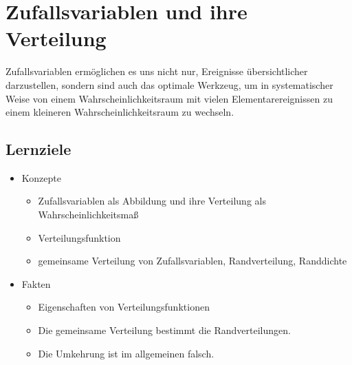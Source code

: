 

\chapter{Zufallsvariablen und ihre Verteilung}\label{ch:zufallsvariablen-und-ihre-verteilung}
Zufallsvariablen ermöglichen es uns nicht nur, Ereignisse übersichtlicher darzustellen, sondern sind auch
das optimale Werkzeug, um in systematischer Weise von einem Wahrscheinlichkeitsraum mit vielen
Elementarereignissen zu einem kleineren Wahrscheinlichkeitsraum zu wechseln.

\section*{Lernziele}
\begin{itemize}
    \item Konzepte
    \begin{itemize}
        \item Zufallsvariablen als Abbildung und ihre Verteilung als Wahrscheinlichkeitsmaß
        \item Verteilungsfunktion
        \item gemeinsame Verteilung von Zufallsvariablen, Randverteilung, Randdichte
    \end{itemize}
    \item Fakten
    \begin{itemize}
        \item Eigenschaften von Verteilungsfunktionen
        \item Die gemeinsame Verteilung bestimmt die Randverteilungen.
        \item Die Umkehrung ist im allgemeinen falsch.
    \end{itemize}
\end{itemize}

